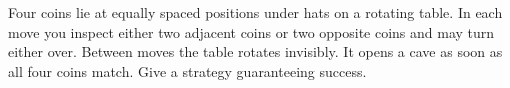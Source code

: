Four coins lie at equally spaced positions under hats on a rotating table. In each move you inspect either two adjacent coins or two opposite coins and may turn either over. Between moves the table rotates invisibly. It opens a cave as soon as all four coins match. Give a strategy guaranteeing success.
